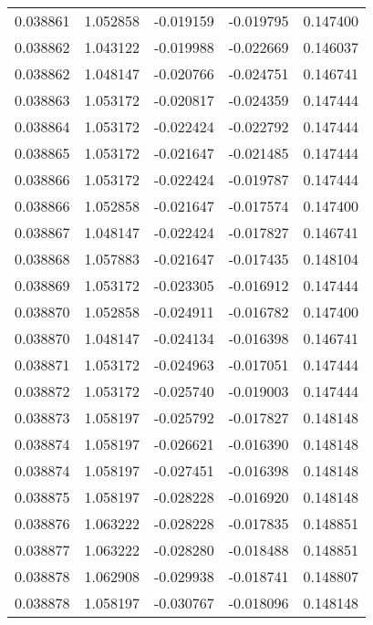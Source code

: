 \begin{tabular}{lrrrr}
0.038861    &  1.052858 & -0.019159 & -0.019795 &             0.147400 \\
0.038862    &  1.043122 & -0.019988 & -0.022669 &             0.146037 \\
0.038862    &  1.048147 & -0.020766 & -0.024751 &             0.146741 \\
0.038863    &  1.053172 & -0.020817 & -0.024359 &             0.147444 \\
0.038864    &  1.053172 & -0.022424 & -0.022792 &             0.147444 \\
0.038865    &  1.053172 & -0.021647 & -0.021485 &             0.147444 \\
0.038866    &  1.053172 & -0.022424 & -0.019787 &             0.147444 \\
0.038866    &  1.052858 & -0.021647 & -0.017574 &             0.147400 \\
0.038867    &  1.048147 & -0.022424 & -0.017827 &             0.146741 \\
0.038868    &  1.057883 & -0.021647 & -0.017435 &             0.148104 \\
0.038869    &  1.053172 & -0.023305 & -0.016912 &             0.147444 \\
0.038870    &  1.052858 & -0.024911 & -0.016782 &             0.147400 \\
0.038870    &  1.048147 & -0.024134 & -0.016398 &             0.146741 \\
0.038871    &  1.053172 & -0.024963 & -0.017051 &             0.147444 \\
0.038872    &  1.053172 & -0.025740 & -0.019003 &             0.147444 \\
0.038873    &  1.058197 & -0.025792 & -0.017827 &             0.148148 \\
0.038874    &  1.058197 & -0.026621 & -0.016390 &             0.148148 \\
0.038874    &  1.058197 & -0.027451 & -0.016398 &             0.148148 \\
0.038875    &  1.058197 & -0.028228 & -0.016920 &             0.148148 \\
0.038876    &  1.063222 & -0.028228 & -0.017835 &             0.148851 \\
0.038877    &  1.063222 & -0.028280 & -0.018488 &             0.148851 \\
0.038878    &  1.062908 & -0.029938 & -0.018741 &             0.148807 \\
0.038878    &  1.058197 & -0.030767 & -0.018096 &             0.148148 \\

\end{tabular}
